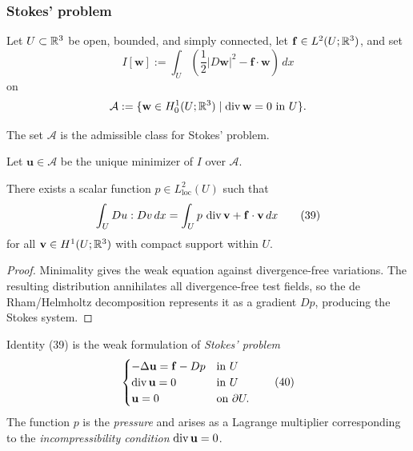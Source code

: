 \subsubsection{Stokes' problem}

Let $U\subset\mathbb{R}^3$ be open, bounded, and simply connected, let $\mathbf f\in L^2(U;\mathbb{R}^3)$, and set
\[
I[\mathbf w]:=\int_U\left(\frac12|D\mathbf w|^2-\mathbf f\cdot\mathbf w\right)\,dx
\]
on
\[
\mathcal A:=\{\mathbf w\in H_0^1(U;\mathbb{R}^3)\mid\operatorname{div}\mathbf w=0\text{ in }U\}.
\]

\begin{definition}
\label{def:admissible-class-stokes-problem}
The set $\mathcal A$ is the admissible class for Stokes' problem.
\end{definition}

Let $\mathbf u\in\mathcal A$ be the unique minimizer of $I$ over $\mathcal A$.

\begin{theorem}
\label{thm:pressure-lagrange-multiplier-stokes}

There exists a scalar function $p \in L^2_{\text{loc}}(U)$ such that
\[
\int_U Du : Dv\, dx = \int_U p\, \operatorname{div} \mathbf{v} + \mathbf{f}\cdot\mathbf{v}\, dx
\tag{39}
\]
for all $\mathbf{v} \in H^1(U;\mathbb{R}^3)$ with compact support within $U$.
\end{theorem}

\begin{proof}
\sketch Minimality gives the weak equation against divergence-free variations. The resulting distribution annihilates all divergence-free test fields, so the de Rham/Helmholtz decomposition represents it as a gradient $Dp$, producing the Stokes system.
\end{proof}

\begin{remark}
\label{rem:stokes-problem-weak-formulation}

Identity (39) is the weak formulation of \textit{Stokes' problem}
\[
\begin{cases}
-\Delta \mathbf{u} = \mathbf{f} - Dp & \text{in } U \\
\operatorname{div} \mathbf{u} = 0 & \text{in } U \\
\mathbf{u} = 0 & \text{on } \partial U.
\end{cases}
\tag{40}
\]
The function $p$ is the \textit{pressure} and arises as a Lagrange multiplier corresponding to the \textit{incompressibility condition} $\operatorname{div} \mathbf{u} = 0$.
\end{remark}

